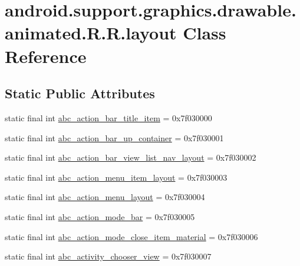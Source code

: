 \hypertarget{classandroid_1_1support_1_1graphics_1_1drawable_1_1animated_1_1_r_1_1layout}{
\section{android.support.graphics.drawable.animated.R.R.layout Class Reference}
\label{classandroid_1_1support_1_1graphics_1_1drawable_1_1animated_1_1_r_1_1layout}
}
\subsection*{Static Public Attributes}
\begin{CompactItemize}
\item 
static final int \hyperlink{classandroid_1_1support_1_1graphics_1_1drawable_1_1animated_1_1_r_1_1layout_4438a70d949cab42baf07016ab1a3544}{abc\_\-action\_\-bar\_\-title\_\-item} = 0x7f030000
\item 
static final int \hyperlink{classandroid_1_1support_1_1graphics_1_1drawable_1_1animated_1_1_r_1_1layout_699db392a62e55e3b9a13fe1c6931e76}{abc\_\-action\_\-bar\_\-up\_\-container} = 0x7f030001
\item 
static final int \hyperlink{classandroid_1_1support_1_1graphics_1_1drawable_1_1animated_1_1_r_1_1layout_76033e7612c9893232d9cfea79b7adeb}{abc\_\-action\_\-bar\_\-view\_\-list\_\-nav\_\-layout} = 0x7f030002
\item 
static final int \hyperlink{classandroid_1_1support_1_1graphics_1_1drawable_1_1animated_1_1_r_1_1layout_d9fa84f97bdce2fd961733e3415f40e1}{abc\_\-action\_\-menu\_\-item\_\-layout} = 0x7f030003
\item 
static final int \hyperlink{classandroid_1_1support_1_1graphics_1_1drawable_1_1animated_1_1_r_1_1layout_8027c24a49938e8345ba62d05a470779}{abc\_\-action\_\-menu\_\-layout} = 0x7f030004
\item 
static final int \hyperlink{classandroid_1_1support_1_1graphics_1_1drawable_1_1animated_1_1_r_1_1layout_39f5342af423c8dad96b80b33bc548b1}{abc\_\-action\_\-mode\_\-bar} = 0x7f030005
\item 
static final int \hyperlink{classandroid_1_1support_1_1graphics_1_1drawable_1_1animated_1_1_r_1_1layout_1613ba5c10fa5f97778171134a34c0f0}{abc\_\-action\_\-mode\_\-close\_\-item\_\-material} = 0x7f030006
\item 
static final int \hyperlink{classandroid_1_1support_1_1graphics_1_1drawable_1_1animated_1_1_r_1_1layout_87f3a3c6fe382e925c025e97f6c8d85c}{abc\_\-activity\_\-chooser\_\-view} = 0x7f030007

\end{CompactItemize}
